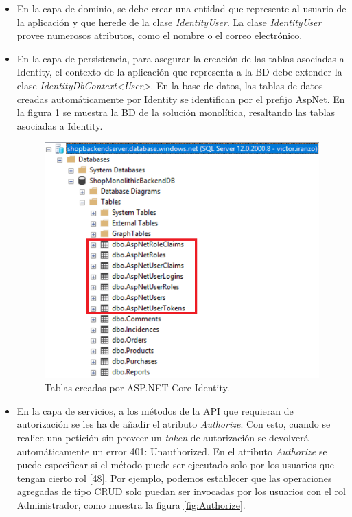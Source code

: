 \documentclass[11pt,spanish,listoffigures]{tfgetsinf}
\begin{document}
\begin{itemize}

\item En la capa de dominio, se debe crear una entidad que represente al usuario de la aplicación y que herede de la clase \textit{IdentityUser}. La clase \textit{IdentityUser} provee numerosos atributos, como el nombre o el correo electrónico.

\item En la capa de persistencia, para asegurar la creación de las tablas asociadas a Identity, el contexto de la aplicación que representa a la BD debe extender la clase \textit{IdentityDbContext<User>}. En la base de datos, las tablas de datos creadas automáticamente por Identity se identifican por el prefijo AspNet. En la figura \ref{fig:BDMonolitica} se muestra la BD de la solución monolítica, resaltando las tablas asociadas a Identity.

\begin{figure}[h]
\centering
\includegraphics[scale=0.8]{BDMonolitica}
\caption{Tablas creadas por ASP.NET Core Identity.}
\label{fig:BDMonolitica}
\end{figure}

\item En la capa de servicios, a los métodos de la API que requieran de autorización se les ha de añadir el atributo \textit{Authorize}. Con esto, cuando se realice una petición sin proveer un \textit{token} de autorización se devolverá automáticamente un error 401: Unauthorized. En el atributo \textit{Authorize} se puede especificar si el método puede ser ejecutado solo por los usuarios que tengan cierto rol \hyperlink{page.80}{[48]}. Por ejemplo, podemos establecer que las operaciones agregadas de tipo CRUD solo puedan ser invocadas por los usuarios con el rol Administrador, como muestra la figura \ref{fig:Authorize}.


\end{itemize}
\end{document}
